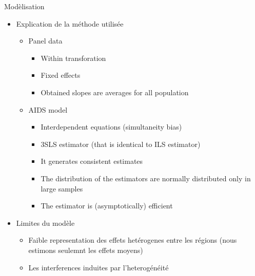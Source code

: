 \documentclass[11pt,ignorenonframetext,]{beamer}
\providecommand{\tightlist}{%
  \setlength{\itemsep}{0pt}\setlength{\parskip}{0pt}}
\begin{document}
\begin{frame}{Modèlisation}
\protect\hypertarget{modelisation}{}

\begin{itemize}
\tightlist
\item
  Explication de la méthode utilisée

  \begin{itemize}
  \tightlist
  \item
    Panel data

    \begin{itemize}
    \tightlist
    \item
      Within transforation
    \item
      Fixed effects
    \item
      Obtained slopes are averages for all population
    \end{itemize}
  \item
    AIDS model

    \begin{itemize}
    \tightlist
    \item
      Interdependent equations (simultaneity bias)
    \item
      3SLS estimator (that is identical to ILS estimator)
    \item
      It generates consistent estimates
    \item
      The distribution of the estimators are normally distributed only
      in large samples
    \item
      The estimator is (asymptotically) efficient
    \end{itemize}
  \end{itemize}
\item
  Limites du modèle

  \begin{itemize}
  \tightlist
  \item
    Faible representation des effets hetérogenes entre les régions (nous
    estimons seulemnt les effets moyens)
  \item
    Les interferences induites par l'heterogénéité
  \end{itemize}
\end{itemize}

\end{frame}
\end{document}
